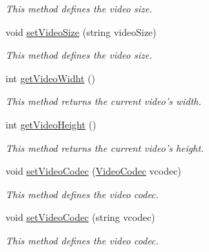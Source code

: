 \begin{DoxyCompactItemize}
\begin{DoxyCompactList}\small\item\em This method defines the video size. \item\end{DoxyCompactList}\item 
void \hyperlink{classbr_1_1ufscar_1_1lince_1_1xpta_1_1streaming_1_1AVEncoder_a23325a577dc2b2fd5ae96d60a5f50beb}{setVideoSize} (string videoSize)
\begin{DoxyCompactList}\small\item\em This method defines the video size. \item\end{DoxyCompactList}\item 
int \hyperlink{classbr_1_1ufscar_1_1lince_1_1xpta_1_1streaming_1_1AVEncoder_a711dede4f5b7351280a753310e199088}{getVideoWidht} ()
\begin{DoxyCompactList}\small\item\em This method returns the current video's width. \item\end{DoxyCompactList}\item 
int \hyperlink{classbr_1_1ufscar_1_1lince_1_1xpta_1_1streaming_1_1AVEncoder_ac80a2f59155f08f21285082270b89946}{getVideoHeight} ()
\begin{DoxyCompactList}\small\item\em This method returns the current video's height. \item\end{DoxyCompactList}\item 
void \hyperlink{classbr_1_1ufscar_1_1lince_1_1xpta_1_1streaming_1_1AVEncoder_a0b9d042b6ae7ef9aee384d311e4a773d}{setVideoCodec} (\hyperlink{namespacebr_1_1ufscar_1_1lince_1_1xpta_1_1streaming_a0bc6a141499db1ee70a729b694d2dace}{VideoCodec} vcodec)
\begin{DoxyCompactList}\small\item\em This method defines the video codec. \item\end{DoxyCompactList}\item 
void \hyperlink{classbr_1_1ufscar_1_1lince_1_1xpta_1_1streaming_1_1AVEncoder_aa70cdaa8e4298f3109fd494460a877fc}{setVideoCodec} (string vcodec)
\begin{DoxyCompactList}\small\item\em This method defines the video codec. \item\end{DoxyCompactList}\item 

\end{DoxyCompactItemize}
